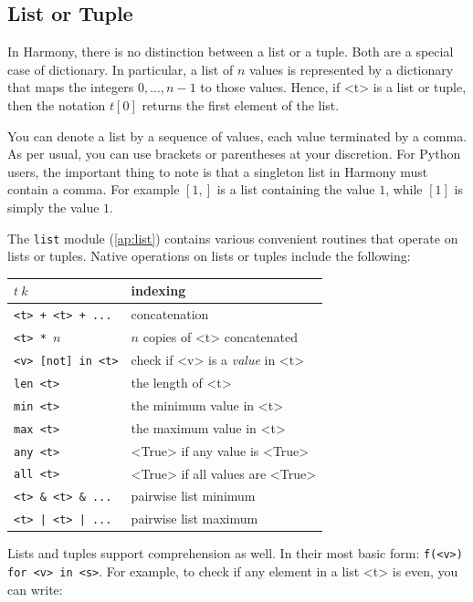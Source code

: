 \documentclass{report}
\begin{document}
{\subsection*{List or Tuple}

In Harmony, there is no distinction between a list or a tuple.
Both are a special case of dictionary.  In particular, a list of
$n$ values is represented by a dictionary that maps the integers
$0, ..., n-1$ to those values.  Hence, if <{t}> is a list or tuple,
then the notation $t[0]$ returns the first element of the list.

You can denote a list by a sequence of values, each value terminated
by a comma.  As per usual, you can use brackets or parentheses
at your discretion.  For Python users, the important thing to note
is that a singleton list in Harmony must contain a comma.  For
example $[1,]$ is a list containing the value $1$, while $[1]$
is simply the value $1$.

The \texttt{list} module (\autoref{ap:list}) contains various
convenient routines that operate on lists or tuples.
Native operations on lists or tuples include the following:

\begin{center}
\begin{tabular}{|l|l|}
\hline
\texttt{$t~k$} & indexing \\
\hline
\texttt{<{t}> + <{t}> + ...} & concatenation \\
\hline
\texttt{<{t}> * $n$} & $n$ copies of <{t}> concatenated \\
\hline
\texttt{<{v}> [not] in <{t}>} & check if <{v}> is a \emph{value} in <{t}> \\
\hline
\texttt{len <{t}>} & the length of <{t}> \\
\hline
\texttt{min <{t}>} & the minimum value in <{t}> \\
\hline
\texttt{max <{t}>} & the maximum value in <{t}> \\
\hline
\texttt{any <{t}>} & <{True}> if any value is <{True}> \\
\hline
\texttt{all <{t}>} & <{True}> if all values are <{True}> \\
\hline
\texttt{<{t}> \& <{t}> \& ...} & pairwise list minimum \\
\hline
\texttt{<{t}> | <{t}> | ...} & pairwise list maximum \\
\hline
\end{tabular}
\end{center}

Lists and tuples support comprehension as well.
In their most basic form: \texttt{f(<{v}>) for <{v}> in <{s}>}.
For example, to check if any element in a list <{t}> is even, you
can write:

}
\end{document}
